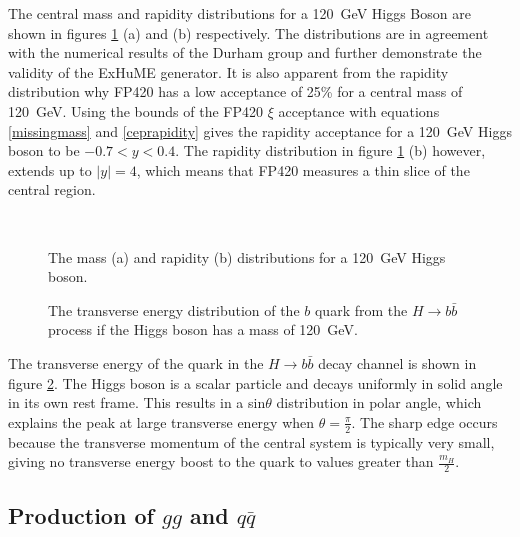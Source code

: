 The central mass and rapidity distributions for a 120~GeV Higgs Boson are shown in figures \ref{higgsmassandrapidity} (a) and (b) respectively. The distributions are in agreement with the numerical results of the Durham group \cite{Khoze:2001xm} 
and further demonstrate the validity of the ExHuME generator. It is also apparent from the rapidity distribution why FP420 has a low acceptance of 25\% for a central mass of 120~GeV. Using the bounds of the FP420 $\xi$ acceptance with equations \ref{missingmass} and \ref{ceprapidity} gives the rapidity acceptance for a 120~GeV Higgs boson to be $-0.7<y<0.4$. The rapidity distribution in figure \ref{higgsmassandrapidity} (b) however, extends up to $|y| = 4$, which means that FP420 measures a thin slice of the central region.

\begin{figure}
\centering
\mbox{
	\quad
	}
\caption[The mass and rapidity distributions for a 120~GeV Higgs boson]{The mass (a) and rapidity (b) distributions for a 120~GeV Higgs boson.\label{higgsmassandrapidity}}
\end{figure}

\begin{figure}
\centering
\caption{The transverse energy distribution of the $b$ quark from the $H \rightarrow b \bar{b}$ process if the Higgs boson has a mass of 120~GeV.\label{bquarket}}
\end{figure}

The transverse energy of the quark in the $H\rightarrow b \bar{b}$ decay channel is shown in figure \ref{bquarket}. The Higgs boson is a scalar particle and decays uniformly in solid angle in its own rest frame. This results in a sin$\theta$ distribution in polar angle, which explains the peak at large transverse energy when $\theta=\frac{\pi}{2}$. 
The sharp edge occurs because the transverse momentum of the central system is typically very small, giving no transverse energy boost to the quark to values greater than $\frac{m_H}{2}$.

\subsection{Production of $gg$ and $q\bar{q}$}

